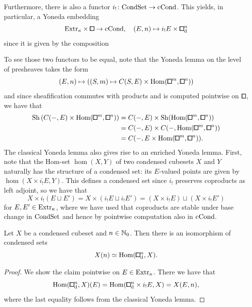 Furthermore, there is also a functor $i_!\colon\mathrm{CondSet}\to\mathrm{cCond}$.
This yields, in particular, a Yoneda embedding
\[
    \extr_\kappa\times\bbox\to\cCond,\quad (E,n)\mapsto i_!E\times{\bbox}^n_\ud
\]
since it is given by the composition
\begin{center}
\end{center}
To see those two functors to be equal,
note that the Yoneda lemma on the level of presheaves takes the form
\[
    (E,n)\mapsto\left((S,m)\mapsto C(S,E)\times\hom({\bbox}^m,{\bbox}^n)\right)
\]
and since sheafification commutes with products and is computed pointwise on $\bbox$,
we have that
\begin{align*}
       \Sh\left(C(-,E)\times\hom({\bbox}^m,{\bbox}^n)\right)
    &= C(-,E)\times\Sh(\hom({\bbox}^m,{\bbox}^n)) \\
    &= C(-,E)\times C(-,\hom({\bbox}^m,{\bbox}^n)) \\
    &= C(-,E\times\hom({\bbox}^m,{\bbox}^n)).
\end{align*}
The classical Yoneda lemma also gives rise to an enriched Yoneda lemma.
First, note that the Hom-set $\hom(X,Y)$ of two condensed cubesets $X$ and $Y$
naturally has the structure of a condensed set:
its $E$-valued points are given by $\hom(X\times i_!E,Y)$.
This defines a condensed set since $i_!$ preserves coproducts as left adjoint,
so we have that
\[
    X\times i_!(E\sqcup E') = X\times (i_!E\sqcup i_!E') = (X\times i_!E)\sqcup(X\times i_!E')
\]
for $E,E'\in\mathrm{Extr}_\kappa$,
where we have used that coproducts are stable under base change in $\mathrm{CondSet}$
and hence by pointwise computation also in $\mathrm{cCond}$.

\begin{lemma}\label{lem:yoneda-enriched}
Let $X$ be a condensed cubeset and $n\in{\mathbb{N}}_0$.
Then there is an isomorphism of condensed sets
\[
    X(n) \simeq \hom({\bbox}^n_\ud,X).
\]
\end{lemma}

\begin{proof}
We show the claim pointwise on $E\in\mathrm{Extr}_\kappa$.
There we have that
\[
    \hom({\bbox}^n_\ud,X)(E) = \hom({\bbox}^n_\ud\times i_!E,X) = X(E,n),
\]
where the last equality follows from the classical Yoneda lemma.
\end{proof}

